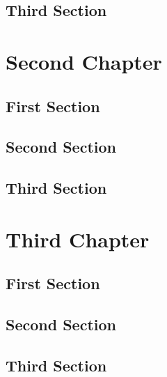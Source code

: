 \documentclass{iasthesis}
\begin{document}
	\section{Third Section}
	\kant
	
	\chapter{Second Chapter}
	\minitoc 
	\kant
	\section{First Section}
	\kant
	\section{Second Section}
	\kant
	\section{Third Section}
	\kant
	
	\chapter{Third Chapter}
	\minitoc 
	\kant
	\section{First Section}
	\kant
	\section{Second Section}
	\kant
	\section{Third Section}
	\kant
		
\end{document}
